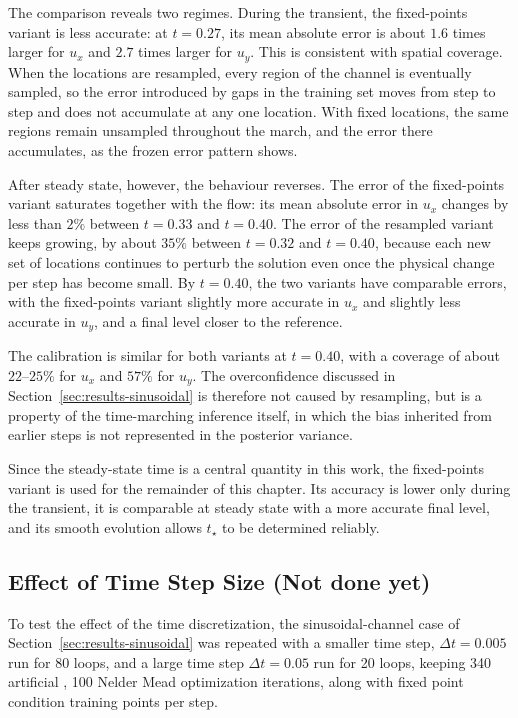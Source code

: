 \documentclass[11pt, a4paper]{report}
\begin{document}
The comparison reveals two regimes. During the transient, the fixed-points variant is
less accurate: at \(t=0.27\), its mean absolute error is about \(1.6\) times larger for
\(u_x\) and \(2.7\) times larger for \(u_y\). This is consistent with spatial
coverage. When the locations are resampled, every region of the channel is eventually
sampled, so the error introduced by gaps in the training set moves from step to step
and does not accumulate at any one location. With fixed locations, the same regions
remain unsampled throughout the march, and the error there accumulates, as the frozen
error pattern shows.

After steady state, however, the behaviour reverses. The error of the fixed-points
variant saturates together with the flow: its mean absolute error in \(u_x\) changes
by less than \(2\%\) between \(t=0.33\) and \(t=0.40\). The error of the resampled
variant keeps growing, by about \(35\%\) between \(t=0.32\) and \(t=0.40\), because
each new set of locations continues to perturb the solution even once the physical
change per step has become small. By \(t=0.40\), the two variants have comparable
errors, with the fixed-points variant slightly more accurate in \(u_x\) and slightly
less accurate in \(u_y\), and a final level closer to the reference.

The calibration is similar for both variants at \(t=0.40\), with a coverage of about
\(22\)--\(25\%\) for \(u_x\) and \(57\%\) for \(u_y\). The overconfidence discussed in
Section~\ref{sec:results-sinusoidal} is therefore not caused by resampling, but is a
property of the time-marching inference itself, in which the bias inherited from
earlier steps is not represented in the posterior variance.

Since the steady-state time is a central quantity in this work, the fixed-points
variant is used for the remainder of this chapter. Its accuracy is lower only during
the transient, it is comparable at steady state with a more accurate final level, and
its smooth evolution allows \(t_\star\) to be determined reliably.

\pagebreak
\subsection{Effect of Time Step Size (Not done yet)}
\label{sec:results-dt-comparison}

To test the effect of the time discretization, the sinusoidal-channel case of
Section~\ref{sec:results-sinusoidal} was repeated with a smaller time step,
\(\Delta t = 0.005\) run for 80 loops, and a large time step \(\Delta t = 0.05\) run for 20 loops, keeping 340 artificial
, 100 Nelder Mead optimization iterations, along with fixed point condition training points per step.
\end{document}
